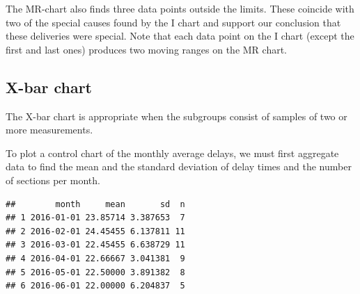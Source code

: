\documentclass[
]{book}
\newenvironment{Shaded}{\begin{snugshade}}{\end{snugshade}}
\newcommand{\AttributeTok}[1]{\textcolor[rgb]{0.13,0.29,0.53}{#1}}
\newcommand{\CommentTok}[1]{\textcolor[rgb]{0.56,0.35,0.01}{\textit{#1}}}
\newcommand{\ConstantTok}[1]{\textcolor[rgb]{0.56,0.35,0.01}{#1}}
\newcommand{\ControlFlowTok}[1]{\textcolor[rgb]{0.13,0.29,0.53}{\textbf{#1}}}
\newcommand{\DecValTok}[1]{\textcolor[rgb]{0.00,0.00,0.81}{#1}}
\newcommand{\FunctionTok}[1]{\textcolor[rgb]{0.13,0.29,0.53}{\textbf{#1}}}
\newcommand{\NormalTok}[1]{#1}
\newcommand{\OtherTok}[1]{\textcolor[rgb]{0.56,0.35,0.01}{#1}}
\newcommand{\SpecialCharTok}[1]{\textcolor[rgb]{0.81,0.36,0.00}{\textbf{#1}}}
\begin{document}
The MR-chart also finds three data points outside the limits. These coincide with two of the special causes found by the I chart and support our conclusion that these deliveries were special. Note that each data point on the I chart (except the first and last ones) produces two moving ranges on the MR chart.

\subsection{X-bar chart}\label{x-bar-chart}

The X-bar chart is appropriate when the subgroups consist of samples of two or more measurements.

To plot a control chart of the monthly average delays, we must first aggregate data to find the mean and the standard deviation of delay times and the number of sections per month.

\begin{Shaded}
\end{Shaded}

\begin{verbatim}
##        month     mean       sd  n
## 1 2016-01-01 23.85714 3.387653  7
## 2 2016-02-01 24.45455 6.137811 11
## 3 2016-03-01 22.45455 6.638729 11
## 4 2016-04-01 22.66667 3.041381  9
## 5 2016-05-01 22.50000 3.891382  8
## 6 2016-06-01 22.00000 6.204837  5
\end{verbatim}
\end{document}
